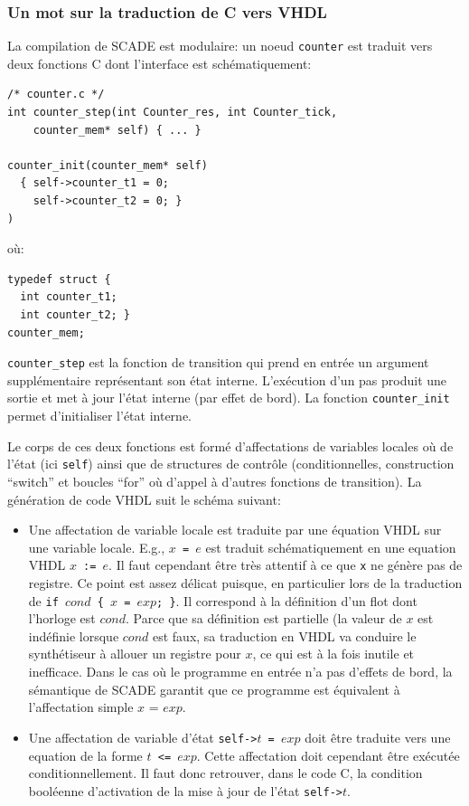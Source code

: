 \documentclass[a4paper]{article}
\begin{document}
\subsubsection{Un mot sur la traduction de C vers VHDL}
La compilation de SCADE est modulaire: un noeud \texttt{counter}
est traduit vers deux fonctions
C dont l'interface est sch\'ematiquement:

\begin{verbatim}
/* counter.c */
int counter_step(int Counter_res, int Counter_tick,
    counter_mem* self) { ... }

counter_init(counter_mem* self)
  { self->counter_t1 = 0;
    self->counter_t2 = 0; }
)
\end{verbatim}
o\`u:
\begin{verbatim}
typedef struct { 
  int counter_t1; 
  int counter_t2; }
counter_mem;
\end{verbatim}
\texttt{counter\_step} est la fonction de transition qui prend
en entr\'ee un argument suppl\'ementaire repr\'esentant son \'etat interne. L'ex\'ecution
d'un pas produit une sortie et met \`a jour l'\'etat interne (par effet de bord).
La fonction \texttt{counter\_init} permet d'initialiser l'\'etat interne.

Le corps de ces deux fonctions est form\'e d'affectations de variables
locales o\`u de l'\'etat (ici \texttt{self}) ainsi que de structures de contr\^ole
(conditionnelles, construction ``switch'' et boucles ``for'' o\`u
d'appel \`a d'autres fonctions de transition). La
g\'en\'eration de code VHDL suit le sch\'ema suivant:

\begin{itemize}
\item Une affectation de variable locale est traduite par une \'equation
  VHDL sur une variable locale. E.g., \texttt{$x$ = $e$} est traduit
  sch\'ematiquement en une equation VHDL \texttt{$x$ := $e$}.  Il faut
  cependant \^etre tr\`es attentif \`a ce que \verb-x- ne g\'en\`ere pas de
  registre.  Ce point est assez d\'elicat puisque, en particulier lors
  de la traduction de \texttt{if $cond$ \{ $x$ = $exp$; \}}. Il
  correspond \`a la d\'efinition d'un flot dont l'horloge est
  $cond$. Parce que sa d\'efinition est partielle (la valeur de $x$ est
  ind\'efinie lorsque $cond$ est faux, sa traduction en VHDL va conduire
  le synth\'etiseur \`a allouer un registre pour $x$, ce qui est \`a la fois
  inutile et inefficace.  Dans le cas o\`u le programme en entr\'ee n'a
  pas d'effets de bord, la s\'emantique de SCADE garantit que ce
  programme est \'equivalent \`a l'affectation simple $x$ = $exp$.
\item Une affectation de variable d'\'etat \texttt{self->$t$ =
    $exp$} doit \^etre traduite vers une equation de la forme
  \texttt{$t$ <= $exp$}. Cette affectation doit cependant \^etre ex\'ecut\'ee
  conditionnellement. Il faut donc retrouver, dans le code C,
  la condition bool\'eenne d'activation de la mise \`a jour de
  l'\'etat \texttt{self->$t$}.
\end{itemize}
\end{document}

